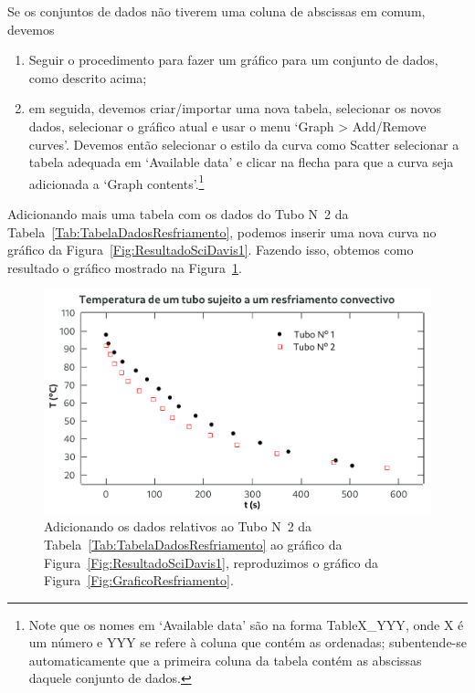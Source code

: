 Se os conjuntos de dados não tiverem uma coluna de abscissas em comum, devemos
\begin{enumerate}
    \item Seguir o procedimento para fazer um gráfico para um conjunto de dados, como descrito acima;
    \item em seguida, devemos criar/importar uma nova tabela, selecionar os novos dados, selecionar o gráfico atual e usar o menu `\textsf{Graph > Add/Remove curves}'. Devemos então selecionar o estilo da curva como Scatter selecionar a tabela adequada em `\textsf{Available data}' e clicar na flecha para que a curva seja adicionada a `\textsf{Graph contents}'.\footnote{Note que os nomes em `\textsf{Available data}' são na forma \textsf{TableX\_YYY}, onde \textsf{X} é um número e \textsf{YYY} se refere à coluna que contém as ordenadas; subentende-se automaticamente que a primeira coluna da tabela contém as abscissas daquele conjunto de dados.}
\end{enumerate}

Adicionando mais uma tabela com os dados do Tubo N\textordmasculine~2 da Tabela~\ref{Tab:TabelaDadosResfriamento}, podemos inserir uma nova curva no gráfico da Figura~\ref{Fig:ResultadoSciDavis1}. Fazendo isso, obtemos como resultado o gráfico mostrado na Figura~\ref{Fig:ResultadoSciDavis2}.

\begin{figure}
\centering
\includegraphics[width=\linewidth]{Graphics/SciDavis/ResultadoSciDavis2.pdf}
\caption{Adicionando os dados relativos ao Tubo N\textordmasculine~2 da Tabela~\ref{Tab:TabelaDadosResfriamento} ao gráfico da Figura~\ref{Fig:ResultadoSciDavis1}, reproduzimos o gráfico da Figura~\ref{Fig:GraficoResfriamento}.\label{Fig:ResultadoSciDavis2}}
\end{figure}

